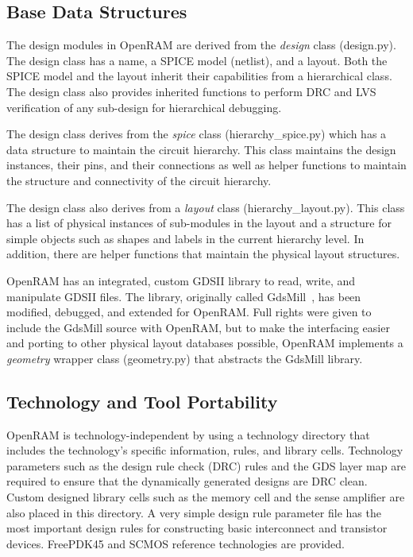
\subsection{Base Data Structures}

The design modules in OpenRAM are derived from the {\it design} class
(design.py). The design class has a name, a SPICE model (netlist), and
a layout. Both the SPICE model and the layout inherit their
capabilities from a hierarchical class. The design class also provides
inherited functions to perform DRC and LVS verification of any
sub-design for hierarchical debugging.

The design class derives from the {\it spice} class
(hierarchy\_\allowbreak spice.py) which has a data structure to
maintain the circuit hierarchy. This class maintains the design
instances, their pins, and their connections as well as helper
functions to maintain the structure and connectivity of the circuit
hierarchy.

The design class also derives from a {\it layout} class (hierarchy\_layout.py).
This class has a list of physical instances of sub-modules in the layout and
a structure for simple objects such as shapes and labels in the
current hierarchy level. In addition, there are helper functions that
maintain the physical layout structures.

OpenRAM has an integrated, custom GDSII library to read, write, and
manipulate GDSII files. The library, originally called
GdsMill~\cite{gdsmill}, has been modified, debugged, and extended for
OpenRAM. Full rights were given to include the GdsMill source with
OpenRAM, but to make the interfacing easier and porting to other
physical layout databases possible, OpenRAM implements a {\it
  geometry} wrapper class (geometry.py) that abstracts the GdsMill
library.

\subsection{Technology and Tool Portability}

OpenRAM is technology-independent by using a technology directory that
includes the technology's specific information, rules, and library
cells. Technology parameters such as the design rule check (DRC) rules
and the GDS layer map are required to ensure that the dynamically
generated designs are DRC clean. Custom designed library cells such as
the memory cell and the sense amplifier are also placed in this
directory. A very simple design rule parameter file has the most
important design rules for constructing basic interconnect and
transistor devices. FreePDK45 and SCMOS reference technologies are provided.

